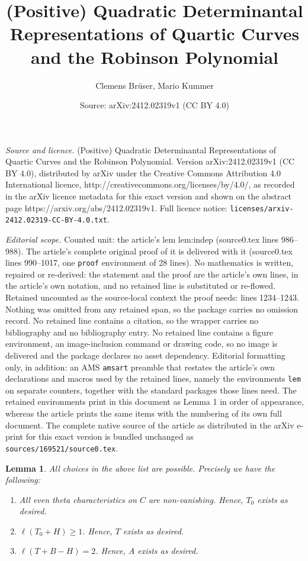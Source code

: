 \documentclass[10pt,a4paper]{amsart}
\title{(Positive) Quadratic Determinantal Representations of Quartic Curves and the Robinson Polynomial}
\author{Clemens Br\"user, Mario Kummer}
\date{Source: arXiv:2412.02319v1 (CC BY 4.0)}
\newtheorem{lem}{Lemma}
\begin{document}
\maketitle

\noindent\emph{Source and licence.} (Positive) Quadratic Determinantal Representations of Quartic Curves and the Robinson Polynomial. Version arXiv:2412.02319v1 (CC BY 4.0), distributed by arXiv under the Creative Commons Attribution 4.0 International licence, http://creativecommons.org/licenses/by/4.0/, as recorded in the arXiv licence metadata for this exact version and shown on the abstract page https://arxiv.org/abs/2412.02319v1. Full licence notice: \texttt{licenses/arxiv-2412.02319-CC-BY-4.0.txt}.\par\smallskip

\noindent\textit{Editorial scope.} Counted unit: the article's lem lem:indep (source0.tex lines 986--988). The article's complete original proof of it is delivered with it (source0.tex lines 990--1017, one \texttt{proof} environment of 28 lines). No mathematics is written, repaired or re-derived: the statement and the proof are the article's own lines, in the article's own notation, and no retained line is substituted or re-flowed.  Retained uncounted as the source-local context the proof needs: lines 1234--1243.  Nothing was omitted from any retained span, so the package carries no omission record.  No retained line contains a citation, so the wrapper carries no bibliography and no bibliography entry.  No retained line contains a figure environment, an image-inclusion command or drawing code, so no image is delivered and the package declares no asset dependency.  Editorial formatting only, in addition: an AMS \texttt{amsart} preamble that restates the article's own declarations and macros used by the retained lines, namely the environments \texttt{lem} on separate counters, together with the standard packages those lines need.  The retained environments print in this document as Lemma 1 in order of appearance, whereas the article prints the same items with the numbering of its own full document.  The complete native source of the article as distributed in the arXiv e-print for this exact version is bundled unchanged as \texttt{sources/169521/source0.tex}.
\begin{lem} \label{lem:validchoice}
    All choices in the above list are possible. Precisely we have the following:
    \begin{enumerate}
        \item All even theta characteristics on $C$ are non-vanishing. Hence, $T_0$ exists as desired.

        \item $\ell(T_0 + H) \geq 1$. Hence, $T$ exists as desired.

        \item $\ell(T + B - H) = 2$. Hence, $A$ exists as desired.
    \end{enumerate}
\end{lem}
\end{document}
